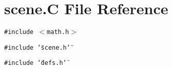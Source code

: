 \section{scene.C File Reference}
\label{scene_8C}
{\tt \#include $<$math.h$>$}\par
{\tt \#include \char`\"{}scene.h\char`\"{}}\par
{\tt \#include \char`\"{}defs.h\char`\"{}}\par
